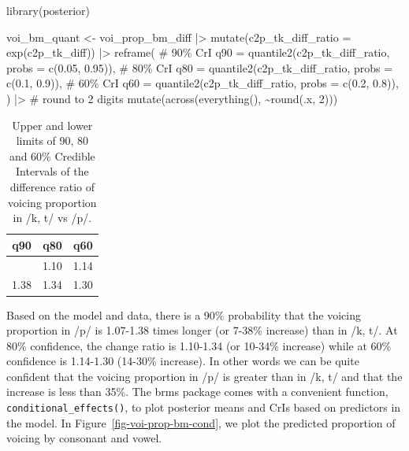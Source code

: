 \documentclass[
  authoryear,
  preprint,
  3p]{elsarticle}
\newenvironment{Shaded}{\begin{snugshade}}{\end{snugshade}}
\newcommand{\AttributeTok}[1]{\textcolor[rgb]{0.40,0.45,0.13}{#1}}
\newcommand{\CommentTok}[1]{\textcolor[rgb]{0.37,0.37,0.37}{#1}}
\newcommand{\DecValTok}[1]{\textcolor[rgb]{0.68,0.00,0.00}{#1}}
\newcommand{\FloatTok}[1]{\textcolor[rgb]{0.68,0.00,0.00}{#1}}
\newcommand{\FunctionTok}[1]{\textcolor[rgb]{0.28,0.35,0.67}{#1}}
\newcommand{\NormalTok}[1]{\textcolor[rgb]{0.00,0.23,0.31}{#1}}
\newcommand{\OtherTok}[1]{\textcolor[rgb]{0.00,0.23,0.31}{#1}}
\newcommand{\SpecialCharTok}[1]{\textcolor[rgb]{0.37,0.37,0.37}{#1}}
\begin{document}
\begin{Shaded}
\begin{Highlighting}[]
\FunctionTok{library}\NormalTok{(posterior)}

\NormalTok{voi\_bm\_quant }\OtherTok{\textless{}{-}}\NormalTok{ voi\_prop\_bm\_diff }\SpecialCharTok{|\textgreater{}} 
  \FunctionTok{mutate}\NormalTok{(}\AttributeTok{c2p\_tk\_diff\_ratio =} \FunctionTok{exp}\NormalTok{(c2p\_tk\_diff)) }\SpecialCharTok{|\textgreater{}} 
  \FunctionTok{reframe}\NormalTok{(}
    \CommentTok{\# 90\% CrI}
    \AttributeTok{q90 =} \FunctionTok{quantile2}\NormalTok{(c2p\_tk\_diff\_ratio, }\AttributeTok{probs =} \FunctionTok{c}\NormalTok{(}\FloatTok{0.05}\NormalTok{, }\FloatTok{0.95}\NormalTok{)),}
    \CommentTok{\# 80\% CrI}
    \AttributeTok{q80 =} \FunctionTok{quantile2}\NormalTok{(c2p\_tk\_diff\_ratio, }\AttributeTok{probs =} \FunctionTok{c}\NormalTok{(}\FloatTok{0.1}\NormalTok{, }\FloatTok{0.9}\NormalTok{)),}
    \CommentTok{\# 60\% CrI}
    \AttributeTok{q60 =} \FunctionTok{quantile2}\NormalTok{(c2p\_tk\_diff\_ratio, }\AttributeTok{probs =} \FunctionTok{c}\NormalTok{(}\FloatTok{0.2}\NormalTok{, }\FloatTok{0.8}\NormalTok{)),}
\NormalTok{  ) }\SpecialCharTok{|\textgreater{}} 
  \CommentTok{\# round to 2 digits}
  \FunctionTok{mutate}\NormalTok{(}\FunctionTok{across}\NormalTok{(}\FunctionTok{everything}\NormalTok{(), }\SpecialCharTok{\textasciitilde{}}\FunctionTok{round}\NormalTok{(.x, }\DecValTok{2}\NormalTok{)))}
\end{Highlighting}
\end{Shaded}

\begin{longtable}[]{@{}rrr@{}}

\caption{\label{tbl-voi-bm-quant}Upper and lower limits of 90, 80 and
60\% Credible Intervals of the difference ratio of voicing proportion in
/k, t/ vs /p/.}

\tabularnewline

\toprule\noalign{}
q90 & q80 & q60 \\
\midrule\noalign{}
\endhead
\bottomrule\noalign{}
\endlastfoot
1.07 & 1.10 & 1.14 \\
1.38 & 1.34 & 1.30 \\

\end{longtable}

Based on the model and data, there is a 90\% probability that the
voicing proportion in /p/ is 1.07-1.38 times longer (or 7-38\% increase)
than in /k, t/. At 80\% confidence, the change ratio is 1.10-1.34 (or
10-34\% increase) while at 60\% confidence is 1.14-1.30 (14-30\%
increase). In other words we can be quite confident that the voicing
proportion in /p/ is greater than in /k, t/ and that the increase is
less than 35\%. The brms package comes with a convenient function,
\texttt{conditional\_effects()}, to plot posterior means and CrIs based
on predictors in the model. In Figure~\ref{fig-voi-prop-bm-cond}, we
plot the predicted proportion of voicing by consonant and vowel.
\end{document}
